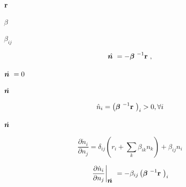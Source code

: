 {\newpage\clearpage
{}%
${\bf r}$%
\lthtmlinlinemathZ
\hfill\lthtmlcheckvsize\clearpage}

{\newpage\clearpage
{}%
$\beta$%
\lthtmlinlinemathZ
\hfill\lthtmlcheckvsize\clearpage}

{\newpage\clearpage
{}%
$\beta_{ij}$%
\lthtmlinlinemathZ
\hfill\lthtmlcheckvsize\clearpage}

{\newpage\clearpage
{}%
\begin{displaymath}
\hat{\mbox{\boldmath {$n$ }}} = -\mbox{\boldmath {$\beta$ }}^{-1}\mbox{${\bf r}$ },
\end{displaymath}%
\lthtmldisplayZ
\hfill\lthtmlcheckvsize\clearpage}

{\newpage\clearpage
{}%
$\dot{\mbox{\boldmath {$n$ }}}=0$%
\lthtmlinlinemathZ
\hfill\lthtmlcheckvsize\clearpage}

{\newpage\clearpage
{}%
$\hat{\mbox{\boldmath {$n$ }}}$%
\lthtmlinlinemathZ
\hfill\lthtmlcheckvsize\clearpage}

{\newpage\clearpage
{}%
\begin{displaymath}
\hat n_i = \left(\mbox{\boldmath {$\beta$ }}^{-1}\mbox{${\bf r}$ }\right)_i>0, \forall i
\end{displaymath}%
\lthtmldisplayZ
\hfill\lthtmlcheckvsize\clearpage}

{\newpage\clearpage
{}%
$\dot{\mbox{\boldmath {$n$ }}}$%
\lthtmlinlinemathZ
\hfill\lthtmlcheckvsize\clearpage}

{\newpage\clearpage
{}%
\begin{displaymath}
\frac{\partial\dot{n}_i}{\partial n_j} =
\delta_{ij}\left(r_i+\sum_k\beta_{ik}n_k\right) + \beta_{ij}n_i
\end{displaymath}%
\lthtmldisplayZ
\hfill\lthtmlcheckvsize\clearpage}

{\newpage\clearpage
{}%
\begin{displaymath}\left.\frac{\partial\dot{n}_i}{\partial n_j}\right|_{\hat{\mbox{\boldmath {$n$ }}}}=
-\beta_{ij}\left(\mbox{\boldmath {$\beta$ }}^{-1}\mbox{${\bf r}$ }\right)_i
\end{displaymath}%
\lthtmldisplayZ
\hfill\lthtmlcheckvsize\clearpage}

